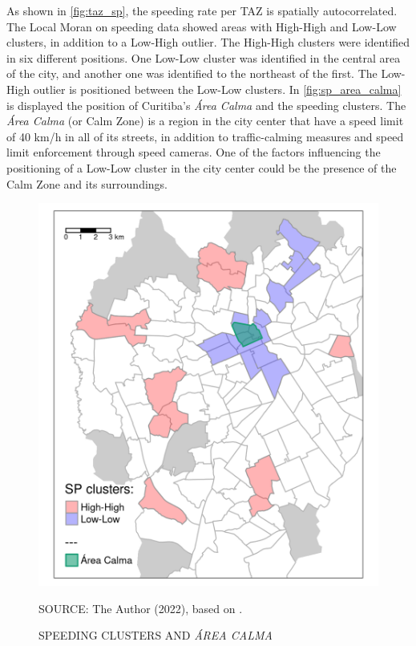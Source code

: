 

As shown in \autoref{fig:taz_sp}, the speeding rate per TAZ is spatially autocorrelated. The Local Moran on speeding data showed areas with High-High and Low-Low clusters, in addition to a Low-High outlier. The High-High clusters were identified in six different positions. One Low-Low cluster was identified in the central area of the city, and another one was identified to the northeast of the first. The Low-High outlier is positioned between the Low-Low clusters. In \autoref{fig:sp_area_calma} is displayed the position of Curitiba's \textit{Área Calma} and the speeding clusters. The \textit{Área Calma} (or Calm Zone) is a region in the city center that have a speed limit of 40 km/h in all of its streets, in addition to traffic-calming measures and speed limit enforcement through speed cameras. One of the factors influencing the positioning of a Low-Low cluster in the city center could be the presence of the Calm Zone and its surroundings. 

\begin{figure}[!htbp]
    \footnotesize
    \captionsetup{font=footnotesize}
    \caption{SPEEDING CLUSTERS AND \textit{ÁREA CALMA}}
    \centering
    \includegraphics{fig/sp_area_calma.png}
    \label{fig:sp_area_calma}
    \par SOURCE: The Author (2022), based on \textcite{IPPUC2021}.
\end{figure}

